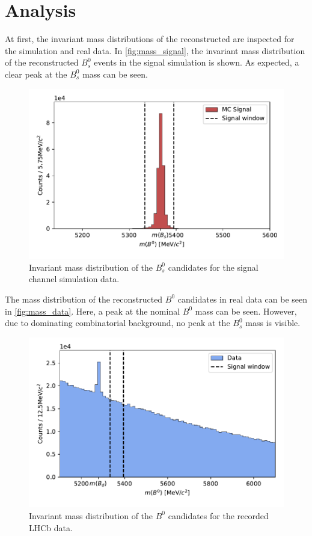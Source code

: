 \section{Analysis}
\label{sec:Analysis}
At first, the invariant mass distributions of the reconstructed \printBdstoPsiKs are inspected for the simulation and real data.
In \autoref{fig:mass_signal}, the invariant mass distribution of the reconstructed $B^0_s$ events in the signal simulation is shown.
As expected, a clear peak at the $B^0_s$ mass can be seen.
\begin{figure}
  \centering
  \includegraphics[width = .8\textwidth]{"content/plots/mass_signal.pdf"}
  \caption{Invariant mass distribution of the $B^0_s$ candidates for the signal channel simulation data.}
  \label{fig:mass_signal}
\end{figure}
The mass distribution of the reconstructed $B^0$ candidates in real data can be seen in \autoref{fig:mass_data}. Here, a peak at the nominal $B^0$ mass can be seen. However,
due to dominating combinatorial background, no peak at the $B^0_s$ mass is visible.
\begin{figure}
  \centering
  \includegraphics[width = .8\textwidth]{"content/plots/mass_data.pdf"}
  \caption{Invariant mass distribution of the $B^0$ candidates for the recorded LHCb data.}
  \label{fig:mass_data}
\end{figure}
